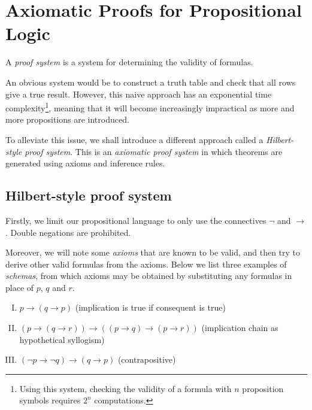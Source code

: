 \section{Axiomatic Proofs for Propositional Logic}

A \emph{proof system} is a system for determining the validity of formulas.

An obvious system would be to construct a truth table and check that all rows give a true result. However, this naive approach has an exponential time complexity\footnote{Using this system, checking the validity of a formula with \(n\) proposition symbols requires \(2^n\) computations.}, meaning that it will become increasingly impractical as more and more propositions are introduced.

To alleviate this issue, we shall introduce a different approach called a \emph{Hilbert-style proof system}. This is an \emph{axiomatic proof system} in which theorems are generated using axioms and inference rules.



\subsection{Hilbert-style proof system}

Firstly, we limit our propositional language to only use the connectives \(\neg\) and \(\rightarrow\). Double negations are prohibited.

Moreover, we will note some \emph{axioms} that are known to be valid, and then try to derive other valid formulas from the axioms. Below we list three examples of \emph{schemas}, from which axioms may be obtained by substituting any formulas in place of \(p\), \(q\) and \(r\).
%
\begin{enumerate}[I.]
    \item \(p \rightarrow (q \rightarrow p)\)
    \hfill (implication is true if consequent is true)
    \label{Ch02-axiom-I}
    
    \item \((p \rightarrow (q \rightarrow r)) \rightarrow ((p \rightarrow q) \rightarrow (p \rightarrow r))\)
    \hfill (implication chain as hypothetical syllogism)
    \label{Ch02-axiom-II}
    
    \item \((\neg p \rightarrow \neg q) \rightarrow (q \rightarrow p)\)
    \hfill (contrapositive)
    \label{Ch02-axiom-III}
\end{enumerate}

